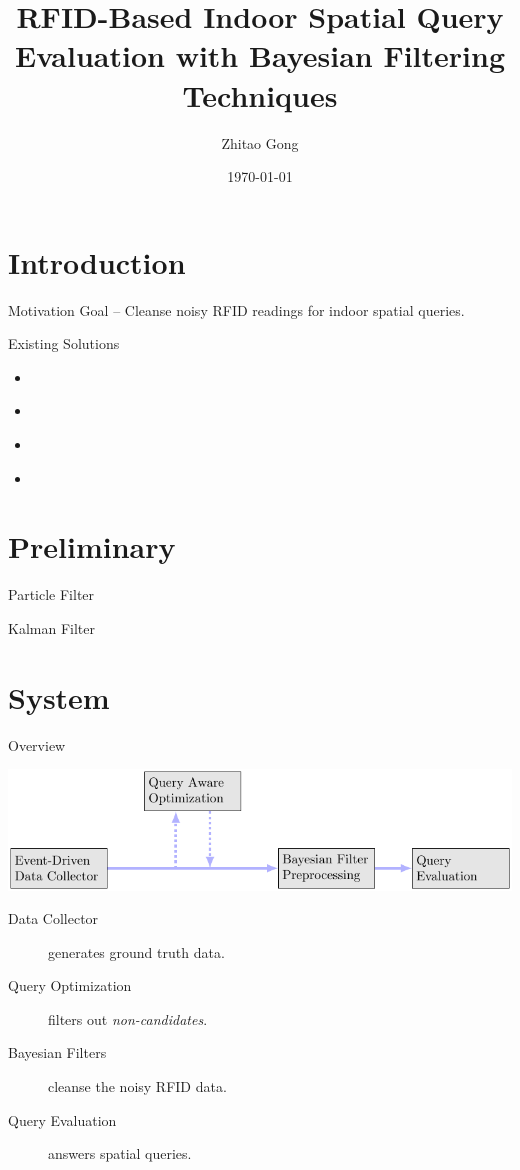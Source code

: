 \documentclass[xcolor={usenames,dvipsnames}]{beamer}
\author{Zhitao Gong}
\date{\today}
\title{RFID-Based Indoor Spatial Query Evaluation with Bayesian Filtering Techniques}
\begin{document}
\maketitle

\section{Introduction}
\label{sec:orga4bafcc}

\begin{frame}[label={sec:org0b88da1}]{Motivation}
\alert{Goal} -- Cleanse noisy RFID readings for indoor spatial queries.
\end{frame}

\begin{frame}[label={sec:org1ded071}]{Existing Solutions}
\begin{itemize}
\item \cite{jensen2009-graph}
\item \cite{yang2009-scalable}
\item \cite{yang2010-probabilistic}
\item \cite{ku2013-bayesian}
\end{itemize}
\end{frame}

\section{Preliminary}
\label{sec:org008e991}

\begin{frame}[label={sec:org21016dd}]{Particle Filter}
\end{frame}

\begin{frame}[label={sec:org569329f}]{Kalman Filter}
\end{frame}

\section{System}
\label{sec:org704f548}

\begin{frame}[label={sec:org913720d}]{Overview}
\begin{center}
\includegraphics[width=.9\linewidth]{img/system-design.pdf}
\end{center}

\begin{description}
\item[{Data Collector}] generates ground truth data.
\item[{Query Optimization}] filters out \emph{non-candidates}.
\item[{Bayesian Filters}] cleanse the noisy RFID data.
\item[{Query Evaluation}] answers spatial queries.
\end{description}
\end{frame}
\end{document}
